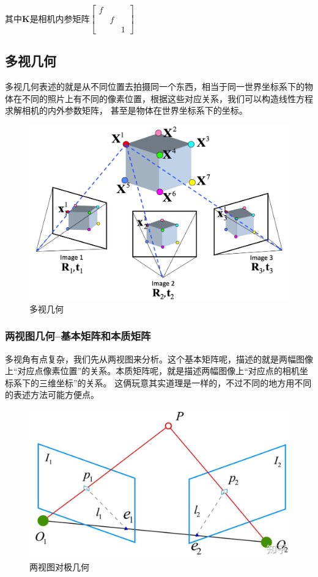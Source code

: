 \documentclass[12pt]{article}
\begin{document}
其中$\mathbf{K}$是相机内参矩阵$\left[\begin{array}{lll}
    f &&\\
    &f&\\
    &&1
\end{array}\right]$

\newpage
\subsection{多视几何}
多视几何表述的就是从不同位置去拍摄同一个东西，相当于同一世界坐标系下的物体在不同的照片上有不同的像素位置，根据这些对应关系，我们可以构造线性方程求解相机的内外参数矩阵，
甚至是物体在世界坐标系下的坐标。
\begin{figure}[ht]
    \centering
    \includegraphics[scale=0.4]{./img/ds.png}
    \caption{多视几何}
    \label{fig:ds}
\end{figure}

\subsubsection{两视图几何--基本矩阵和本质矩阵}
多视角有点复杂，我们先从两视图来分析。这个基本矩阵呢，描述的就是两幅图像上“对应点像素位置”的关系。本质矩阵呢，就是描述两幅图像上“对应点的相机坐标系下的三维坐标”的关系。
这俩玩意其实道理是一样的，不过不同的地方用不同的表述方法可能方便点。

\begin{figure}[ht]
    \centering
    \includegraphics[scale=0.4]{./img/epipolar.png}
    \caption{两视图对极几何}
    \label{fig:ep}
\end{figure}
\end{document}
